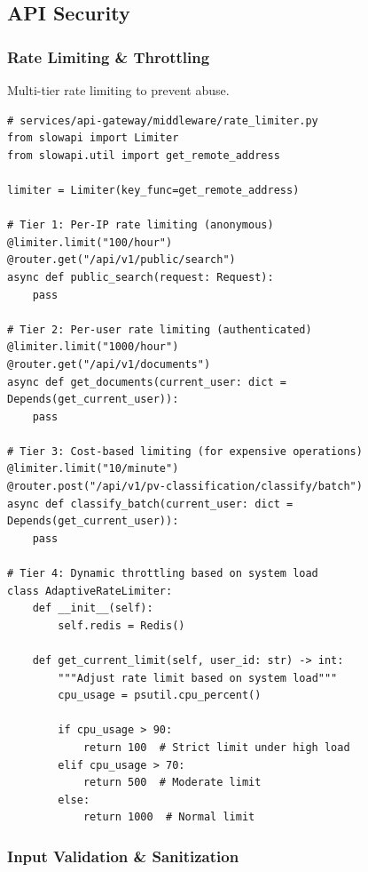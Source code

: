 \subsection{API Security}

\subsubsection{Rate Limiting \& Throttling}

Multi-tier rate limiting to prevent abuse.

\begin{lstlisting}[style=pythonstyle]
# services/api-gateway/middleware/rate_limiter.py
from slowapi import Limiter
from slowapi.util import get_remote_address

limiter = Limiter(key_func=get_remote_address)

# Tier 1: Per-IP rate limiting (anonymous)
@limiter.limit("100/hour")
@router.get("/api/v1/public/search")
async def public_search(request: Request):
    pass

# Tier 2: Per-user rate limiting (authenticated)
@limiter.limit("1000/hour")
@router.get("/api/v1/documents")
async def get_documents(current_user: dict = Depends(get_current_user)):
    pass

# Tier 3: Cost-based limiting (for expensive operations)
@limiter.limit("10/minute")
@router.post("/api/v1/pv-classification/classify/batch")
async def classify_batch(current_user: dict = Depends(get_current_user)):
    pass

# Tier 4: Dynamic throttling based on system load
class AdaptiveRateLimiter:
    def __init__(self):
        self.redis = Redis()
    
    def get_current_limit(self, user_id: str) -> int:
        """Adjust rate limit based on system load"""
        cpu_usage = psutil.cpu_percent()
        
        if cpu_usage > 90:
            return 100  # Strict limit under high load
        elif cpu_usage > 70:
            return 500  # Moderate limit
        else:
            return 1000  # Normal limit
\end{lstlisting}

\subsubsection{Input Validation \& Sanitization}

